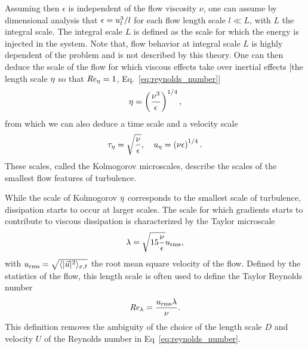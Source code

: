 Assuming then $\epsilon$ is independent of the flow viscosity $\nu$, one can assume by dimensional analysis that $\epsilon = u_l^3 / l$ for each flow length scale $l \ll L$, with $L$ the integral scale.
The integral scale $L$ is defined as the scale for which the energy is injected in the system.
Note that, flow behavior at integral scale $L$ is highly dependent of the problem and is not described by this theory.
One can then deduce the scale of the flow for which viscous effects take over inertial effects [the length scale $\eta$ so that $\mathit{Re}_{\eta} = 1$, Eq.~\eqref{eq:reynolds_number}]
\begin{equation}
	\label{eq:kolmogorov_scale}
	\eta = \left( \frac{\nu^3}{\epsilon} \right)^{1/4},
\end{equation}
from which we can also deduce a time scale and a velocity scale
\begin{equation}
	\label{eq:kolmogorov}
	\tau_{\eta} = \sqrt{\frac{\nu}{\epsilon}}, \quad u_{\eta} = \left(\nu \epsilon \right)^{1/4}.
\end{equation}
These scales, called the Kolmogorov microscales, describe the scales of the smallest flow features of turbulence.

While the scale of Kolmogorov $\eta$ corresponds to the smallest scale of turbulence, dissipation starts to occur at larger scales.
The scale for which gradients starts to contribute to viscous dissipation is characterized by the Taylor microscale \citep{taylor1935statistical}
\begin{equation}
	\label{eq:taylor_microscale}
	\lambda = \sqrt{15 \frac{\nu}{\epsilon}} u_{\mathrm{rms}},
\end{equation}
with $u_{\mathrm{rms}} = \sqrt{ \langle \lvert\vec{u}\rvert^2 \rangle_{x,t} }$ the root mean square velocity of the flow.
Defined by the statistics of the flow, this length scale is often used to define the Taylor Reynolds number
\begin{equation}\label{eq:taylor_scale_reynolds}
	\mathit{Re}_{\lambda} = \frac{u_{\mathrm{rms}} \lambda}{\nu}.
\end{equation}
This definition removes the ambiguity of the choice of the length scale $D$ and velocity $U$ of the Reynolds number in Eq~\eqref{eq:reynolds_number}.

